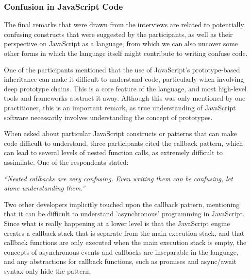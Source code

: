 \subsubsection*{Confusion in JavaScript Code} 

The final remarks that were drawn from the interviews are related to potentially confusing constructs that were suggested by the participants, as well as their perspective on JavaScript as a language, from which we can also uncover some other forms in which the language itself might contribute to writing confuse code.

One of the participants mentioned that the use of JavaScript's prototype-based inheritance can make it difficult to understand code, particularly when involving  deep prototype chains. This is a core feature of the language, and most high-level tools and frameworks abstract it away. Although this was only mentioned by one practitioner, this is an important remark, as true understanding of JavaScript software necessarily involves understanding the concept of prototypes.

When asked about particular JavaScript constructs or patterns that can make code difficult to understand, three participants cited the callback pattern, which can lead to several levels of nested function calls, as extremely difficult to assimilate. One of the respondents stated:

\begin{mq}
\emph{``Nested callbacks are very confusing. Even writing them can be confusing, let alone understanding them.''}
\end{mq}

Two other developers implicitly touched upon the callback pattern, mentioning that it can be difficult to understand 'asynchronous' programming in JavaScript. Since what is really happening at a lower level is that the JavaScript engine creates a callback stack that is separate from the main execution stack, and that callback functions are only executed when the main execution stack is empty, the concepts of asynchronous events and callbacks are inseparable in the language, and any abstractions for callback functions, such as promises and async/await syntax only hide the pattern.



